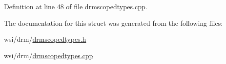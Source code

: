Definition at line 48 of file drmscopedtypes.\+cpp.


\begin{DoxyCode}{0}
\end{DoxyCode}


The documentation for this struct was generated from the following files\+:\begin{DoxyCompactItemize}
\item 
wsi/drm/\mbox{\hyperlink{drmscopedtypes_8h}{drmscopedtypes.\+h}}\item 
wsi/drm/\mbox{\hyperlink{drmscopedtypes_8cpp}{drmscopedtypes.\+cpp}}\end{DoxyCompactItemize}

